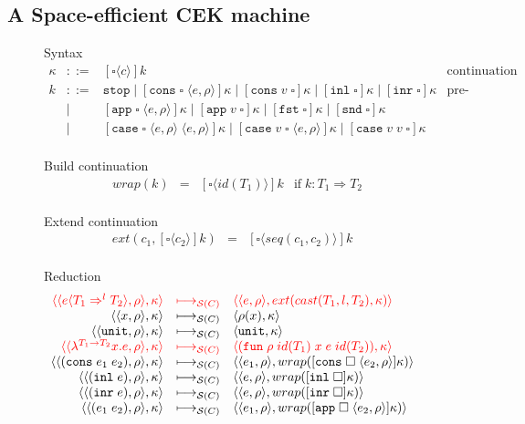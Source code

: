 \documentclass[acmsmall,review,anonymous]{acmart}\settopmatter{printfolios=true,printccs=false,printacmref=false}
\newcommand{\stxrule}[3]{#1 & ::= & #3 & \text{#2}\\}
\newcommand{\stxrulecont}[1]{& | & #1 & \\}
\newcommand{\funrule}[3]{#1 &=& #2 & #3\\}
\newcommand{\sOOinspect}[3]{\langle\langle#1,#2\rangle,#3\rangle}
\newcommand{\sOOreturn}[2]{\langle#1,#2\rangle}
\newcommand{\sOOhalt}[1]{\mathtt{Halt} \; #1}
\newcommand{\eOOvar}[1]{#1}
\newcommand{\eOOsole}[0]{\mathtt{unit}}
\newcommand{\eOOlam}[4]{\lambda^{#1\rightarrow{}#2}#3.#4}
\newcommand{\eOOapp}[2]{#1 \; #2}
\newcommand{\eOOcons}[2]{\mathtt{cons} \; #1 \; #2}
\newcommand{\eOOinl}[1]{\mathtt{inl} \; #1}
\newcommand{\eOOinr}[1]{\mathtt{inr} \; #1}
\newcommand{\eOOcast}[4]{#1 \langle \cOOcast{#2}{#3}{#4} \rangle}
\newcommand{\cOOcast}[3]{#1 \Rightarrow^{#2} #3}
\newcommand{\rOOsucc}[1]{\mathtt{succ}\;#1}
\newcommand{\rOOfail}[1]{\mathtt{fail}\;#1}
\newcommand{\kOOmt}[0]{\mathtt{stop}}
\newcommand{\kOOconsI}[3]{[\mathtt{cons} \; \square \; \langle#1,#2\rangle ]#3}
\newcommand{\kOOconsII}[2]{[\mathtt{cons} \; #1 \; \square]#2}
\newcommand{\kOOinl}[1]{[\mathtt{inl} \; \square]#1}
\newcommand{\kOOinr}[1]{[\mathtt{inr} \; \square]#1}
\newcommand{\kOOappI}[3]{
	[\mathtt{app} \; \square \; \langle#1,#2\rangle ]#3
}
\newcommand{\kOOappII}[2]{
	[\mathtt{app} \; #1 \; \square]#2}
\newcommand{\kOOcar}[1]{[\mathtt{fst} \; \square]#1}
\newcommand{\kOOcdr}[1]{[\mathtt{snd} \; \square]#1}
\newcommand{\kOOcaseI}[4]{
	[\mathtt{case} \; \square \; \langle#1,#3\rangle \; \langle#2,#3\rangle ]#4}
\newcommand{\kOOcaseII}[4]{
	[\mathtt{case} \; #1 \; \square \; \langle#2,#3\rangle ]#4}
\newcommand{\kOOcaseIII}[3]{
	[\mathtt{case} \; #1 \; #2 \; \square]#3}
\newcommand{\kOOcast}[2]{
	[\square \langle #1 \rangle]#2}
\newcommand{\hcvOOfun}[5]{\mathtt{fun} \; #2 \; #1 \; #3 \; #4 \; #5}
\newcommand{\hcvOOtt}[0]{\mathtt{unit}}
\newcommand{\sidecond}[1]{\text{if}\;#1}
\newcommand{\judgeSreduce}[3]{#2 \longmapsto_{\mathcal{S}(#1)} #3}
\newcommand{\redruleS}[3]{#1 & \longmapsto_{\mathcal{S}(C)} & #2 & #3\\}
\newcommand{\hiredruleS}[3]{\highlight{#1} & 
\highlight{\longmapsto_{\mathcal{S}(C)}} & \highlight{#2} & \highlight{#3} \\}
\newcommand{\ineffCEKD}{$\mathcal{D}$}
\newcommand{\highlight}[1]{{\color{red} #1}}
\begin{document}

\subsection{A Space-efficient CEK machine}
\label{sec:framework:cek}

\begin{figure}
	Syntax
	\[
	\begin{array}{rclr}
	\stxrule{\kappa}{continuation}{
		\kOOcast{c}{k}
	}
	\stxrule{k}{pre-continuations}{
		\kOOmt \mid{}
		\kOOconsI{e}{\rho}{\kappa} \mid
		\kOOconsII{v}{\kappa} \mid
		\kOOinl{\kappa} \mid
		\kOOinr{\kappa}
	}
	\stxrulecont{
		\kOOappI{e}{\rho}{\kappa} \mid
		\kOOappII{v}{\kappa} \mid
		\kOOcar{\kappa} \mid
		\kOOcdr{\kappa}
	}
	\stxrulecont{
		\kOOcaseI{e}{e}{\rho}{\kappa} \mid
		\kOOcaseII{v}{e}{\rho}{\kappa} \mid
		\kOOcaseIII{v}{v}{\kappa}
	}
	\end{array}
	\]
	
	Build continuation 
	\[
	\begin{array}{rclc}
	\funrule{wrap(k)}{\kOOcast{id(T_1)}{k}}{
		\sidecond{k : T_1 \Longrightarrow T_2}}
	\end{array}
	\]
	
	Extend continuation 
	\[
	\begin{array}{rclc}
	\funrule{ext(c_1,\kOOcast{c_2}{k})}{
		\kOOcast{seq(c_1,c_2)}{k}
	}{}
	\end{array}
	\]
	
	Reduction \fbox{$\judgeSreduce{C}{s}{s}$}
	\[
	\begin{array}{rclr}
	\hiredruleS{
		\sOOinspect{\eOOcast{e}{T_1}{l}{T_2}}{\rho}{\kappa}
	}{
		\sOOinspect{e}{\rho}{ext(cast(T_1,l,T_2),\kappa)}
	}{}
	\redruleS{
		\sOOinspect{\eOOvar{x}}{\rho}{\kappa}
	}{	
		\sOOreturn{\rho(x)}{\kappa}
	}{}
	\redruleS{
		\sOOinspect{\eOOsole}{\rho}{\kappa}
	}{
		\sOOreturn{\hcvOOtt}{\kappa}
	}{}
	\hiredruleS{
		\sOOinspect{\eOOlam{T_1}{T_2}{x}{e}}{\rho}{\kappa}
	}{
		\sOOreturn{(\hcvOOfun{id(T_1)}{\rho}{x}{e}{id(T_2)})}{\kappa}
	}{}
	\redruleS{
		\sOOinspect{(\eOOcons{e_1}{e_2})}{\rho}{\kappa}
	}{
		\sOOinspect{e_1}{\rho}{
			wrap(\kOOconsI{e_2}{\rho}{\kappa})
		}
	}{}
	\redruleS{
		\sOOinspect{(\eOOinl{e})}{\rho}{\kappa}
	}{
		\sOOinspect{e}{\rho}{wrap(\kOOinl{\kappa})}
	}{}
	\redruleS{
		\sOOinspect{(\eOOinr{e})}{\rho}{\kappa}
	}{
		\sOOinspect{e}{\rho}{wrap(\kOOinr{\kappa})}
	}{}
	\redruleS{
		\sOOinspect{(\eOOapp{e_1}{e_2})}{\rho}{\kappa}
	}{
		\sOOinspect{e_1}{\rho}{wrap(\kOOappI{e_2}{\rho}{\kappa})}}{}
	

\end{array}\]
\end{figure}
\end{document}
